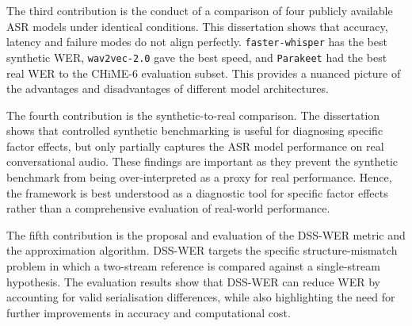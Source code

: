 The third contribution is the conduct of a comparison of four publicly available ASR models under identical conditions. This dissertation shows that accuracy, latency and failure modes do not align perfectly. \texttt{faster-whisper} has the best synthetic WER, \texttt{wav2vec-2.0} gave the best speed, and \texttt{Parakeet} had the best real WER to the CHiME-6 evaluation subset. This provides a nuanced picture of the advantages and disadvantages of different model architectures.

The fourth contribution is the synthetic-to-real comparison. The dissertation shows that controlled synthetic benchmarking is useful for diagnosing specific factor effects, but only partially captures the ASR model performance on real conversational audio. These findings are important as they prevent the synthetic benchmark from being over-interpreted as a proxy for real performance. Hence, the framework is best understood as a diagnostic tool for specific factor effects rather than a comprehensive evaluation of real-world performance.

The fifth contribution is the proposal and evaluation of the DSS-WER metric and the approximation algorithm. DSS-WER targets the specific structure-mismatch problem in which a two-stream reference is compared against a single-stream hypothesis. The evaluation results show that DSS-WER can reduce WER by accounting for valid serialisation differences, while also highlighting the need for further improvements in accuracy and computational cost.

